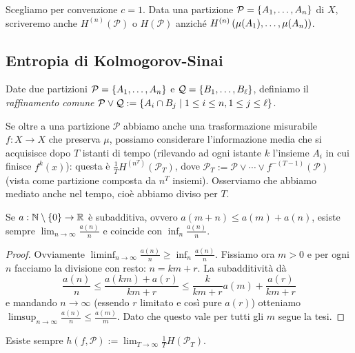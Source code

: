 Scegliamo per convenzione $c=1$.
Data una partizione $\mathcal{P}=\left\{A_1,\dots,A_n\right\}$ di $X$, scriveremo anche $H^{(n)}(\mathcal{P})$ o $H(\mathcal{P})$
anziché $H^{(n)}\left(\mu(A_1),\dots,\mu(A_n)\right)$.

\subsection{Entropia di Kolmogorov-Sinai}

\begin{defi}Date due partizioni $\mathcal{P}=\left\{A_1,\dots,A_n\right\}$ e $\mathcal{Q}=\left\{B_1,\dots,B_\ell\right\}$,
definiamo il \emph{raffinamento comune} $\mathcal{P}\vee\mathcal{Q}:=\left\{A_i\cap B_j\mid 1\le i\le n,1\le j\le \ell\right\}$.
\end{defi}

Se oltre a una partizione $\mathcal{P}$ abbiamo anche una trasformazione misurabile $f:X\to X$ che preserva $\mu$,
possiamo considerare l'informazione media che si acquisisce dopo $T$ istanti di tempo (rilevando
ad ogni istante $k$ l'insieme $A_i$ in cui finisce $f^k(x)$): questa è $\frac{1}{T}H^{(n^T)}(\mathcal{P}_T)$,
dove $\mathcal{P}_T:=\mathcal{P}\vee\cdots\vee f^{-(T-1)}(\mathcal{P})$ (vista come partizione composta
da $n^T$ insiemi). Osserviamo che abbiamo mediato anche nel tempo, cioè abbiamo diviso per $T$.

\begin{lemma}\label{fekete} Se $a:\mathbb{N}\setminus\left\{0\right\}\to\mathbb{R}$ è subadditiva, ovvero $a(m+n)\le a(m)+a(n)$, esiste sempre
$\lim_{n\to\infty}\frac{a(n)}{n}$ e coincide con $\inf_n\frac{a(n)}{n}$.
\end{lemma}

\begin{proof}Ovviamente $\liminf_{n\to\infty}\frac{a(n)}{n}\ge\inf_n\frac{a(n)}{n}$. Fissiamo ora $m>0$
e per ogni $n$ facciamo la divisione con resto: $n=km+r$. La subadditività dà
\[ \frac{a(n)}{n}\le\frac{a(km)+a(r)}{km+r}\le\frac{k}{km+r}a(m)+\frac{a(r)}{km+r} \]
e mandando $n\to\infty$ (essendo $r$ limitato e così pure $a(r)$) otteniamo $\limsup_{n\to\infty}\frac{a(n)}{n}\le\frac{a(m)}{m}$.
Dato che questo vale per tutti gli $m$ segue la tesi.
\end{proof}

\begin{cor}Esiste sempre $h(f,\mathcal{P}):=\lim_{T\to\infty}\frac{1}{T}H(\mathcal{P}_T)$.
\end{cor}

